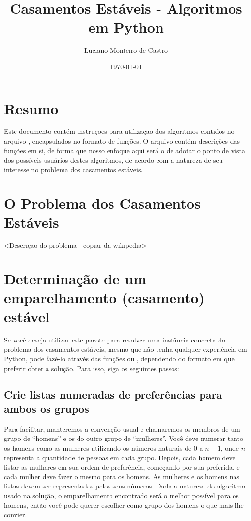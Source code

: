 \documentclass[11pt]{article}
\title{Casamentos Estáveis - Algoritmos em Python}
\author{Luciano Monteiro de Castro}
\date{\today}
\begin{document}
\maketitle

\setcounter{tocdepth}{3}
\tableofcontents
\vspace*{1cm}

\section{Resumo}
\label{sec-1}

Este documento contém instruções para utilização dos algoritmos contidos no
arquivo , encapsulados no formato de funções. 
O arquivo contém descrições das funções em si, de forma que nosso enfoque aqui
será o de adotar o ponto de vista dos possíveis usuários destes algoritmos,
de acordo com a natureza de seu interesse no problema dos casamentos estáveis.
\section{O Problema dos Casamentos Estáveis}
\label{sec-2}


<Descrição do problema - copiar da wikipedia>
\section{Determinação de um emparelhamento (casamento) estável}
\label{sec-3}

Se você deseja utilizar este pacote para resolver uma instância concreta do problema
dos casamentos estáveis, mesmo que não tenha qualquer experiência em Python, 
pode fazê-lo através das funções  ou 
, dependendo do formato em que preferir obter a solução.
Para isso, siga os seguintes passos:
\subsection{Crie listas numeradas de preferências para ambos os grupos}
\label{sec-3-1}

Para facilitar, manteremos a convenção usual e chamaremos os membros de um grupo de
``homens'' e os do outro grupo de ``mulheres''. Você deve numerar tanto os homens como
as mulheres utilizando os números naturais de $0$ a $n-1$, onde $n$ representa a
quantidade de pessoas em cada grupo. Depois, cada homem deve listar as mulheres em
sua ordem de preferência, começando por sua preferida, e cada mulher deve fazer o
mesmo para os homens. As mulheres e os homens nas listas devem ser representados pelos
seus números. Dada a natureza do algoritmo usado na solução, o emparelhamento
encontrado será o melhor possível para os homens, então você pode querer escolher
como grupo dos homens o que mais lhe convier.
\end{document}
